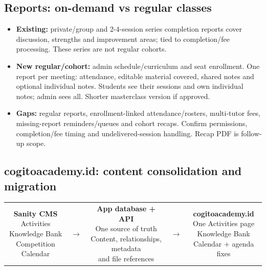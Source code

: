 \documentclass[11pt,a4paper]{article}
\newcommand{\flowbox}[2]{\fbox{\parbox[c]{#1}{\centering\small #2}}}
\begin{document}
\subsection*{Reports: on-demand vs regular classes}

\begin{itemize}
\item \textbf{Existing:} private/\allowbreak{}group and 2-4-session series completion reports cover discussion, strengths and improvement areas; tied to completion/\allowbreak{}fee processing. These series are not regular cohorts.
\item \textbf{New regular/\allowbreak{}cohort:} admin schedule/\allowbreak{}curriculum and seat enrollment. One report per meeting: attendance, editable material covered, shared notes and optional individual notes. Students see their sessions and own individual notes; admin sees all. Shorter masterclass version if approved.
\item \textbf{Gaps:} regular reports, enrollment-linked attendance/\allowbreak{}rosters, multi-tutor fees, missing-report reminders/\allowbreak{}queues and cohort recaps. Confirm permissions, completion/\allowbreak{}fee timing and undelivered-session handling. Recap PDF is follow-up scope.
\end{itemize}

\subsection*{cogitoacademy.id: content consolidation and migration}

\begin{center}
\begin{tabular}{@{}c@{\;}c@{\;}c@{\;}c@{\;}c@{}}
\flowbox{43mm}{\textbf{Sanity CMS}\\Activities\\Knowledge Bank\\Competition Calendar} & $\rightarrow$ & \flowbox{43mm}{\textbf{App database + API}\\One source of truth\\Content, relationships, metadata\\and file references} & $\rightarrow$ & \flowbox{43mm}{\textbf{cogitoacademy.id}\\One Activities page\\Knowledge Bank\\Calendar + agenda fixes} \\
\end{tabular}
\end{center}
\end{document}
